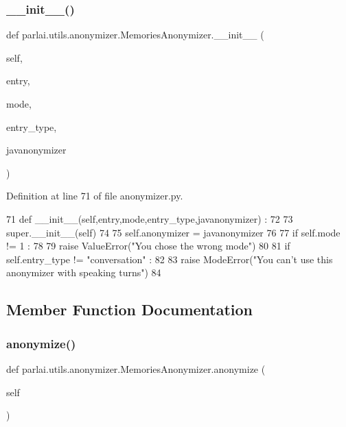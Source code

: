 \subsubsection{\texorpdfstring{\+\_\+\+\_\+init\+\_\+\+\_\+()}{\_\_init\_\_()}}
{\footnotesize\ttfamily def parlai.\+utils.\+anonymizer.\+Memories\+Anonymizer.\+\_\+\+\_\+init\+\_\+\+\_\+ (\begin{DoxyParamCaption}\item[{}]{self,  }\item[{}]{entry,  }\item[{}]{mode,  }\item[{}]{entry\+\_\+type,  }\item[{}]{javanonymizer }\end{DoxyParamCaption})}



Definition at line 71 of file anonymizer.\+py.


\begin{DoxyCode}
71     \textcolor{keyword}{def }\_\_init\_\_(self,entry,mode,entry\_type,javanonymizer) : 
72 
73         super.\_\_init\_\_(self)
74 
75         self.anonymizer = javanonymizer
76 
77         \textcolor{keywordflow}{if} self.mode != 1 :  
78 
79             \textcolor{keywordflow}{raise} ValueError(\textcolor{stringliteral}{"You chose the wrong mode"}) 
80 
81         \textcolor{keywordflow}{if} self.entry\_type != \textcolor{stringliteral}{"conversation"} : 
82 
83             \textcolor{keywordflow}{raise} ModeError(\textcolor{stringliteral}{"You can't use this anonymizer with speaking turns"})
84 
\end{DoxyCode}


\subsection{Member Function Documentation}
\mbox{\label{classparlai_1_1utils_1_1anonymizer_1_1MemoriesAnonymizer_ac22260ce2e76207a6b72122c7fb0ba00}} 
\subsubsection{\texorpdfstring{anonymize()}{anonymize()}}
{\footnotesize\ttfamily def parlai.\+utils.\+anonymizer.\+Memories\+Anonymizer.\+anonymize (\begin{DoxyParamCaption}\item[{}]{self }\end{DoxyParamCaption})}



